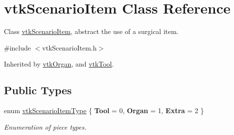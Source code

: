 \hypertarget{classvtkScenarioItem}{
\section{vtkScenarioItem Class Reference}
\label{classvtkScenarioItem}
}


Class \hyperlink{classvtkScenarioItem}{vtkScenarioItem}, abstract the use of a surgical item.  


{\ttfamily \#include $<$vtkScenarioItem.h$>$}

Inherited by \hyperlink{classvtkOrgan}{vtkOrgan}, and \hyperlink{classvtkTool}{vtkTool}.\subsection*{Public Types}
\begin{DoxyCompactItemize}
\item 
enum \hyperlink{classvtkScenarioItem_a77bcdf6979a30db08fa7934f218994e0}{vtkScenarioItemType} \{ {\bfseries Tool} =  0, 
{\bfseries Organ} =  1, 
{\bfseries Extra} =  2
 \}
\begin{DoxyCompactList}\small\item\em Enumeration of piece types. \item\end{DoxyCompactList}\end{DoxyCompactItemize}
